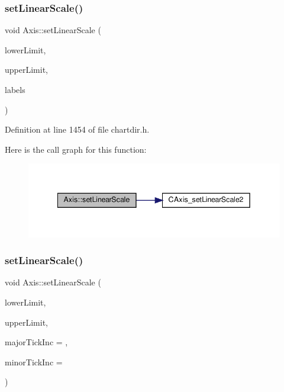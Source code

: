 \subsubsection{\texorpdfstring{set\+Linear\+Scale()}{setLinearScale()}\hspace{0.1cm}{\footnotesize\ttfamily [2/3]}}
{\footnotesize\ttfamily void Axis\+::set\+Linear\+Scale (\begin{DoxyParamCaption}\item[{double}]{lower\+Limit,  }\item[{double}]{upper\+Limit,  }\item[{\hyperlink{class_string_array}{String\+Array}}]{labels }\end{DoxyParamCaption})\hspace{0.3cm}{\ttfamily [inline]}}



Definition at line 1454 of file chartdir.\+h.

Here is the call graph for this function\+:
\nopagebreak
\begin{figure}[H]
\begin{center}
\leavevmode
\includegraphics[width=342pt]{class_axis_af149d48d3168531e48ef42f99695b8b7_cgraph}
\end{center}
\end{figure}
\mbox{\label{class_axis_a1c02cb45cc6f4d01d0b420298ebe668c}} 
\subsubsection{\texorpdfstring{set\+Linear\+Scale()}{setLinearScale()}\hspace{0.1cm}{\footnotesize\ttfamily [3/3]}}
{\footnotesize\ttfamily void Axis\+::set\+Linear\+Scale (\begin{DoxyParamCaption}\item[{double}]{lower\+Limit,  }\item[{double}]{upper\+Limit,  }\item[{double}]{major\+Tick\+Inc = {},  }\item[{double}]{minor\+Tick\+Inc = {} }\end{DoxyParamCaption})\hspace{0.3cm}{\ttfamily [inline]}}



